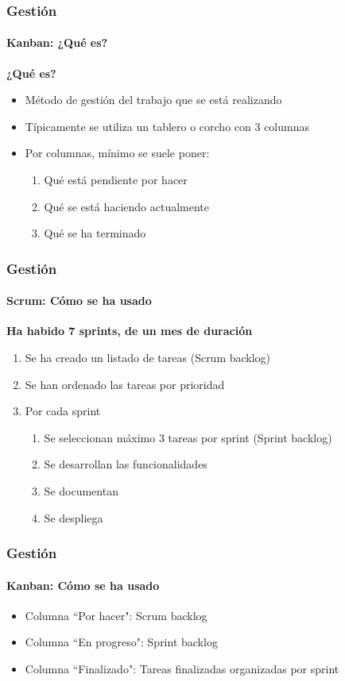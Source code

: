 \begin{frame}
	\frametitle{Gesti\'on}
	\framesubtitle{Kanban: ¿Qu\'e es?}
	
	\textbf{¿Qu\'e es?}
	\begin{itemize}
		\item M\'etodo de gesti\'on del trabajo que se est\'a realizando
		\item T\'ipicamente se utiliza un tablero o corcho con 3 columnas
		\item Por columnas, m\'inimo se suele poner:
		\begin{enumerate}
			\item Qu\'e est\'a pendiente por hacer
			\item Qu\'e se est\'a haciendo actualmente
			\item Qu\'e se ha terminado
		\end{enumerate}
		
	\end{itemize}
	
	
\end{frame}

\begin{frame}
	\frametitle{Gesti\'on}
	\framesubtitle{Scrum: C\'omo se ha usado}
	
	\textbf{Ha habido 7 sprints, de un mes de duraci\'on}
	\begin{enumerate}
		\item Se ha creado un listado de tareas (Scrum backlog)
		\item Se han ordenado las tareas por prioridad
		\item Por cada sprint
		\begin{enumerate}
			\item Se seleccionan m\'aximo 3 tareas por sprint (Sprint backlog)
			\item Se desarrollan las funcionalidades
			\item Se documentan
			\item Se despliega
		\end{enumerate}
	\end{enumerate}	
\end{frame}

\begin{frame}
	\frametitle{Gesti\'on}
	\framesubtitle{Kanban: C\'omo se ha usado}
	\begin{itemize}
		\item Columna ``Por hacer": Scrum backlog
		\item Columna ``En progreso": Sprint backlog
		\item Columna ``Finalizado": Tareas finalizadas organizadas por 
		sprint
	\end{itemize}
\end{frame}